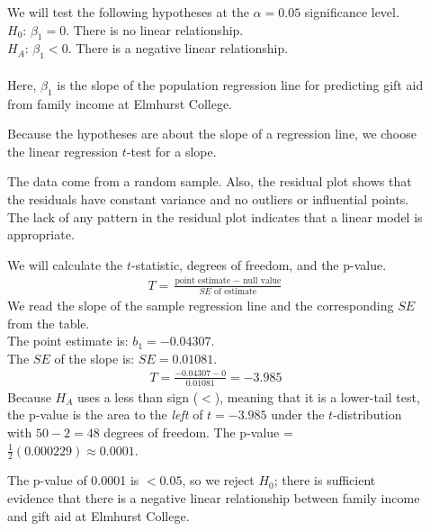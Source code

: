 \begin{examplewrap}
\begin{nexample}
\begin{description}
\item[]  We will test the following hypotheses at the $\alpha=0.05$ significance level.\\
$H_0$: $\beta_1 = 0$. There is no linear relationship.\\
$H_A$: $\beta_1 < 0$. There is a negative linear relationship.  
\\
\\
Here, $\beta_1$ is the slope of the population regression line for predicting gift aid from family income at Elmhurst College.
\item[] Because the hypotheses are about the slope of a regression line, we choose the linear regression $t$-test for a slope.  
\item[]  The data come from a random sample.  Also, the residual plot shows that the residuals have constant variance and no outliers or influential points.  The lack of any pattern in the residual plot indicates that a linear model is appropriate.
\item[]  We will calculate the $t$-statistic, degrees of freedom, and the p-value.
\begin{align*}
T = \frac{\text{point estimate } - \text{ null value}}{SE \text{ of estimate}}
\end{align*}
We read the slope of the sample regression line and the corresponding $SE$ from the table.
\\
The point estimate is: $b_1 = -0.04307$.
\\
The $SE$ of the slope is: $SE = 0.01081$.  
\begin{align*}
T = \frac{-0.04307 - 0}{0.01081} = -3.985
\end{align*}
Because $H_A$ uses a less than sign ($<$), meaning that it is a lower-tail test, the \mbox{p-value} is the area to the \emph{left} of $t=-3.985$ under the $t$-distribution with $50-2=48$ degrees of freedom.  The p-value = $\frac{1}{2}(0.000229)\approx 0.0001$.  
\item[]  The p-value of 0.0001 is $< 0.05$, so we reject $H_0$; there is sufficient evidence that there is a negative linear relationship between family income and gift aid at Elmhurst College.  
\end{description}



\end{nexample}
\end{examplewrap}
\label{overallAidIncomeInformalAssessmentOfRegressionLineSlope}




